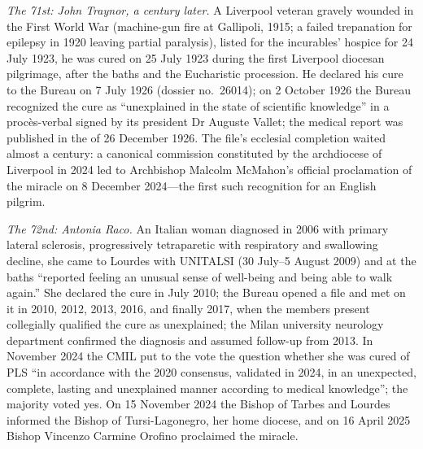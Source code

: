 \emph{The 71st: John Traynor, a century later.} A Liverpool
veteran gravely wounded in the First World War (machine-gun fire
at Gallipoli, 1915; a failed trepanation for epilepsy in 1920
leaving partial paralysis), listed for the incurables' hospice for
24 July 1923, he was cured on 25 July 1923 during the first
Liverpool diocesan pilgrimage, after the baths and the Eucharistic
procession. He declared his cure to the Bureau on 7 July 1926
(dossier no.~26014); on 2 October 1926 the Bureau recognized the
cure as ``unexplained in the state of scientific knowledge'' in a
proc\`es-verbal signed by its president Dr Auguste Vallet; the
medical report was published in the 
of 26 December 1926. The file's ecclesial completion waited
almost a century: a canonical commission constituted by the
archdiocese of Liverpool in 2024 led to Archbishop Malcolm
McMahon's official proclamation of the miracle on 8 December
2024---the first such recognition for an English
pilgrim.

\emph{The 72nd: Antonia Raco.} An Italian woman diagnosed in 2006
with primary lateral sclerosis, progressively tetraparetic with
respiratory and swallowing decline, she came to Lourdes with
UNITALSI (30 July--5 August 2009) and at the baths ``reported
feeling an unusual sense of well-being and being able to walk
again.'' She declared the cure in July 2010; the Bureau opened a
file and met on it in 2010, 2012, 2013, 2016, and finally 2017,
when the members present collegially qualified the cure as
unexplained; the Milan university neurology department confirmed
the diagnosis and assumed follow-up from 2013. In November 2024
the CMIL put to the vote the question whether she was cured of
PLS ``in accordance with the 2020 consensus, validated in 2024,
in an unexpected, complete, lasting and unexplained manner
according to medical knowledge''; the majority voted yes. On 15
November 2024 the Bishop of Tarbes and Lourdes informed the
Bishop of Tursi-Lagonegro, her home diocese, and on 16 April 2025
Bishop Vincenzo Carmine Orofino proclaimed the
miracle.


